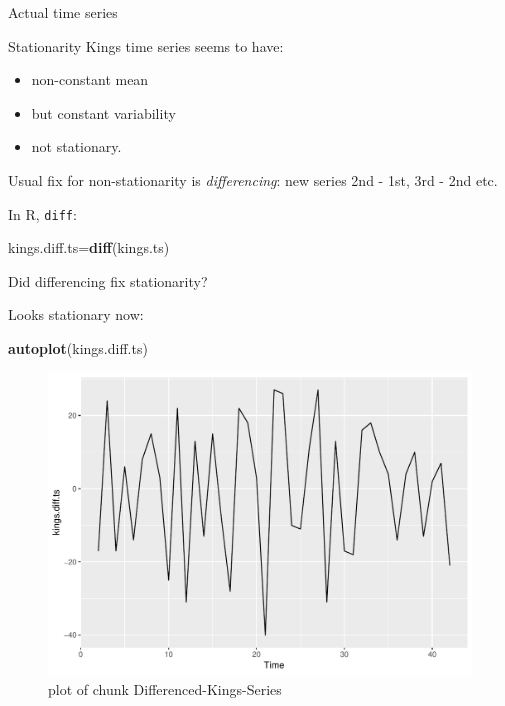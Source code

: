 \documentclass[ignorenonframetext,]{beamer}
\newenvironment{Shaded}{\begin{snugshade}}{\end{snugshade}}
\newcommand{\KeywordTok}[1]{\textcolor[rgb]{0.13,0.29,0.53}{\textbf{#1}}}
\newcommand{\NormalTok}[1]{#1}
\providecommand{\tightlist}{%
  \setlength{\itemsep}{0pt}\setlength{\parskip}{0pt}}
\begin{document}
\begin{frame}[fragile]{Actual time series}
\begin{block}{Stationarity}
Kings time series seems to have:

\begin{itemize}
\tightlist
\item
  non-constant mean
\item
  but constant variability
\item
  not stationary.
\end{itemize}

Usual fix for non-stationarity is \emph{differencing}: new series 2nd -
1st, 3rd - 2nd etc.

In R, \texttt{diff}:

\begin{Shaded}
\begin{Highlighting}[]
\NormalTok{kings.diff.ts=}\KeywordTok{diff}\NormalTok{(kings.ts)}
\end{Highlighting}
\end{Shaded}

Did differencing fix stationarity?

Looks stationary now:

\begin{Shaded}
\begin{Highlighting}[]
\KeywordTok{autoplot}\NormalTok{(kings.diff.ts)}
\end{Highlighting}
\end{Shaded}

\begin{figure}
\centering
\includegraphics{figure/Differenced-Kings-Series-1.pdf}
\caption{plot of chunk Differenced-Kings-Series}
\end{figure}

\end{block}


\end{frame}
\end{document}
